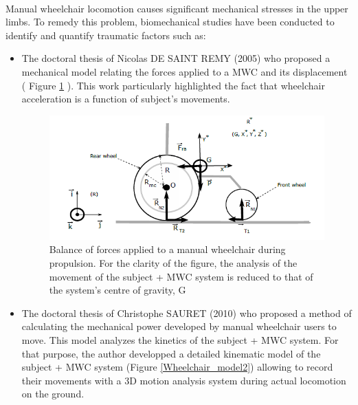 \paragraph{}Manual wheelchair locomotion causes significant mechanical stresses in the upper limbs. To remedy this problem, biomechanical studies have been conducted to identify and quantify traumatic factors such as:
\begin{itemize}
\item The doctoral thesis of Nicolas DE SAINT REMY (2005) \cite{Remy2005} who proposed a
mechanical model relating the forces applied to a MWC and its displacement ( Figure \ref{Wheelchair_model} ). This work particularly highlighted the fact that wheelchair acceleration is a function of subject's movements.

\begin{figure}[h]
\center
\includegraphics[scale = 0.6]{images/wheelchair_model2}
\caption{Balance of forces applied to a manual wheelchair during propulsion. For the clarity of the figure, the analysis of the movement of the {subject + MWC} system is reduced to that of the system's centre of gravity, G \cite{Remy2005}}
\label{Wheelchair_model}
\end{figure}

\item The doctoral thesis of Christophe SAURET (2010) \cite{Sauret2010} who proposed a method of calculating the mechanical power developed by manual wheelchair users to move. This model analyzes the kinetics of the {subject + MWC} system. For that purpose, the author developped a detailed kinematic model of the {subject + MWC} system (Figure \ref{Wheelchair_model2}) allowing to record their movements with a 3D motion analysis system during actual locomotion on the ground. 



\end{itemize}
